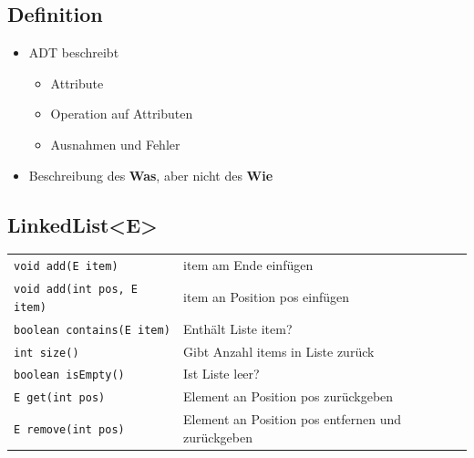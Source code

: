\documentclass[a4paper, landscape, 8pt]{scrartcl}
\begin{document}
\begin{multicols*}{4}
            \subsection{Definition}
                \begin{itemize}
                    \item ADT beschreibt
                    \begin{itemize}
                        \item Attribute
                        \item Operation auf Attributen
                        \item Ausnahmen und Fehler
                    \end{itemize}
                    \item Beschreibung des {\bfseries Was}, aber nicht des {\bfseries Wie}
                \end{itemize}

            \subsection{LinkedList<E>}
                \begin{tabular}{l|p{3cm}}
                    \texttt{void add(E item)} & item am Ende einfügen \\
                    \texttt{void add(int pos, E item)} & item an Position pos einfügen \\
                    \texttt{boolean contains(E item)} & Enthält Liste item? \\
                    \texttt{int size()} & Gibt Anzahl items in Liste zurück \\
                    \texttt{boolean isEmpty()} & Ist Liste leer? \\
                    \texttt{E get(int pos)} & Element an Position pos zurückgeben \\
                    \texttt{E remove(int pos)} & Element an Position pos entfernen und zurückgeben \\
                \end{tabular}
            

\end{multicols*}
\end{document}
